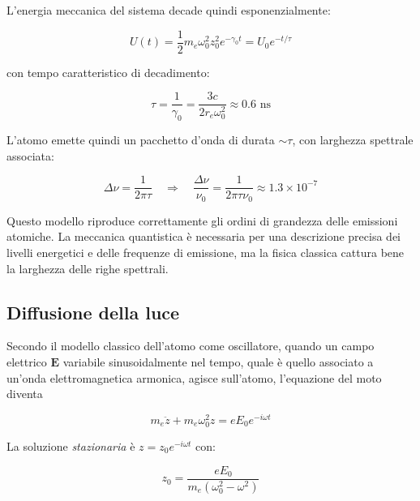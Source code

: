 L'energia meccanica del sistema decade quindi esponenzialmente:

\begin{tcolorbox}[colback=yellow!10!white, colframe=orange!70!black, boxrule=0.8pt]
\begin{equation}
    U(t) = \frac{1}{2}m_e\omega_0^2 z_0^2 e^{-\gamma_0 t} = U_0 e^{-t/\tau}
\end{equation}
\end{tcolorbox}

con tempo caratteristico di decadimento:

\begin{tcolorbox}[colback=yellow!10!white, colframe=orange!70!black, boxrule=0.8pt]
\begin{equation}
    \tau = \frac{1}{\gamma_0} = \frac{3c}{2r_e\omega_0^2} \approx 0.6 \text{ ns}
\end{equation}
\end{tcolorbox}

L'atomo emette quindi un pacchetto d'onda di durata $\sim\tau$, con larghezza spettrale associata:

\begin{equation}
    \Delta\nu = \frac{1}{2\pi\tau} \quad \Rightarrow \quad \frac{\Delta\nu}{\nu_0} = \frac{1}{2\pi\tau\nu_0} \approx 1.3\times10^{-7}
\end{equation}

Questo modello riproduce correttamente gli ordini di grandezza delle emissioni atomiche. La meccanica quantistica è necessaria per una descrizione precisa dei livelli energetici e delle frequenze di emissione, ma la fisica classica cattura bene la larghezza delle righe spettrali.

\subsection{Diffusione della luce}

Secondo il modello classico dell'atomo come oscillatore, quando un campo elettrico $\mathbf{E}$ variabile sinusoidalmente nel tempo, quale è quello associato a un'onda elettromagnetica armonica, agisce sull'atomo, l'equazione del moto diventa 

\begin{equation}
    m_e\ddot{z} + m_e\omega_0^2 z = eE_0 e^{-i\omega t}
\end{equation}

La soluzione \emph{stazionaria} è $z = z_0 e^{-i\omega t}$ con:

\begin{equation}
    z_0 = \frac{eE_0}{m_e(\omega_0^2 - \omega^2)}
\end{equation}

